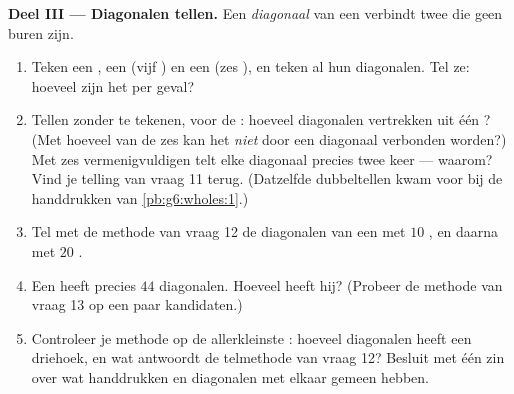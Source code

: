 \begin{problem}
\medskip
\noindent\textbf{Deel III --- Diagonalen tellen.}
Een \emph{diagonaal} van een  verbindt twee  die geen buren
zijn.
\begin{enumerate}[resume]
  \item Teken een , een  (vijf ) en een  (zes
        ), en teken al hun diagonalen. Tel ze: hoeveel zijn het per
        geval?
  \item Tellen zonder te tekenen, voor de : hoeveel diagonalen vertrekken
        uit één ? (Met hoeveel van de zes  kan het \emph{niet}
        door een diagonaal verbonden worden?) Met zes vermenigvuldigen telt elke
        diagonaal precies twee keer --- waarom? Vind je telling van vraag 11
        terug. (Datzelfde dubbeltellen kwam voor bij de handdrukken van
        \cref{pb:g6:wholes:1}.)
  \item Tel met de methode van vraag 12 de diagonalen van een  met $10$
        , en daarna met $20$ .
  \item Een  heeft precies $44$ diagonalen. Hoeveel  heeft
        hij? (Probeer de methode van vraag 13 op een paar kandidaten.)
  \item Controleer je methode op de allerkleinste : hoeveel diagonalen
        heeft een driehoek, en wat antwoordt de telmethode van vraag 12?
        Besluit met één zin over wat handdrukken en diagonalen met elkaar gemeen
        hebben.
\end{enumerate}
\end{problem}
